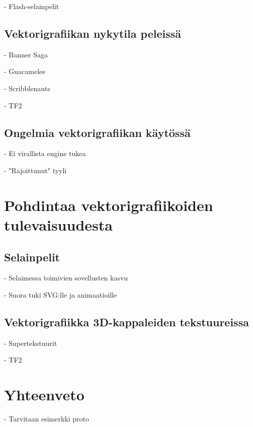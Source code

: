 \documentclass[utf8,bachelor]{gradu3}
\begin{document}
- Flash-selainpelit

\section{Vektorigrafiikan nykytila peleissä}

- Banner Saga

- Guacamelee

- Scribblenauts

- TF2

\section{Ongelmia vektorigrafiikan käytössä}

- Ei virallista engine tukea

- "Rajoittunut" tyyli

\chapter{Pohdintaa vektorigrafiikoiden tulevaisuudesta}

\section{Selainpelit}

- Selaimessa toimivien sovellusten kasvu

- Suora tuki SVG:lle ja animaatioille

\section{Vektorigrafiikka 3D-kappaleiden tekstuureissa}

- Supertekstuurit

- TF2

\chapter{Yhteenveto}

- Tarvitaan esimerkki proto

\printbibliography
\end{document}
